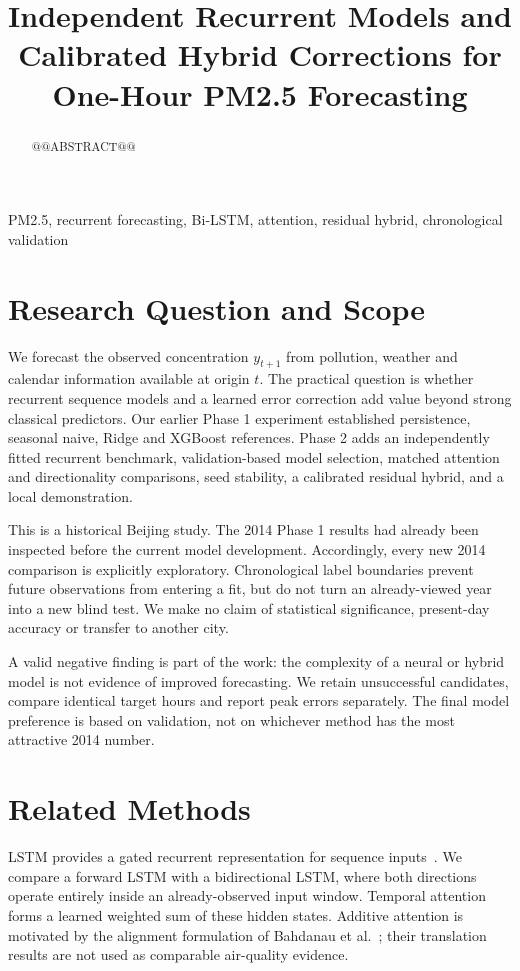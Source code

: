 \documentclass[conference]{IEEEtran}
\title{Independent Recurrent Models and Calibrated Hybrid Corrections for One-Hour PM2.5 Forecasting}
\author{\IEEEauthorblockA{\begin{tabular}{ccc}
\textbf{Samarth Khera} & \textbf{Pratham Malhotra} & \textbf{Adityaraj Pal}\\
2401010407 & 2401010343 & 2401010042\\[5pt]
\textbf{Tattva Rajput} & \textbf{Himanshu} & \\
2401010478 & 2401010188 &
\end{tabular}}\IEEEauthorblockA{CSAI Student Project 19 --- Phase 2: Deep Learning and Hybrid Forecasting}}
\begin{document}
\maketitle
\thispagestyle{plain}
\begin{abstract}
@@ABSTRACT@@
\end{abstract}
\begin{IEEEkeywords}
PM2.5, recurrent forecasting, Bi-LSTM, attention, residual hybrid, chronological validation
\end{IEEEkeywords}

\section{Research Question and Scope}
We forecast the observed concentration $y_{t+1}$ from pollution, weather and calendar information available at origin $t$. The practical question is whether recurrent sequence models and a learned error correction add value beyond strong classical predictors. Our earlier Phase 1 experiment established persistence, seasonal naive, Ridge and XGBoost references. Phase 2 adds an independently fitted recurrent benchmark, validation-based model selection, matched attention and directionality comparisons, seed stability, a calibrated residual hybrid, and a local demonstration.

This is a historical Beijing study. The 2014 Phase 1 results had already been inspected before the current model development. Accordingly, every new 2014 comparison is explicitly exploratory. Chronological label boundaries prevent future observations from entering a fit, but do not turn an already-viewed year into a new blind test. We make no claim of statistical significance, present-day accuracy or transfer to another city.

A valid negative finding is part of the work: the complexity of a neural or hybrid model is not evidence of improved forecasting. We retain unsuccessful candidates, compare identical target hours and report peak errors separately. The final model preference is based on validation, not on whichever method has the most attractive 2014 number.

\section{Related Methods}
LSTM provides a gated recurrent representation for sequence inputs~\cite{pytorch}. We compare a forward LSTM with a bidirectional LSTM, where both directions operate entirely inside an already-observed input window. Temporal attention forms a learned weighted sum of these hidden states. Additive attention is motivated by the alignment formulation of Bahdanau et al.~\cite{attention}; their translation results are not used as comparable air-quality evidence.
\end{document}
